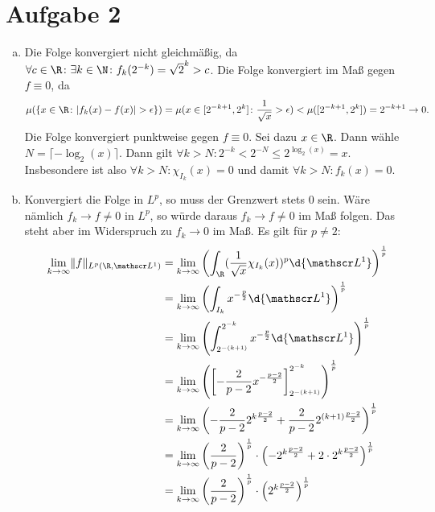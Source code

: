\documentclass{article}
\newcommand{\norm}[1]{\lVert #1 \rVert}
\begin{document}
    \section*{Aufgabe 2}
    \begin{enumerate}[(a)]
        \item Die Folge konvergiert nicht gleichmäßig, da $\forall c \in \R\colon \exists k \in \N \colon f_k(2^{-k}) = \sqrt{2}^k > c$.
        Die Folge konvergiert im Maß gegen $f \equiv 0$, da 
        \[ 
            \mu(\{x \in \R\colon |f_k(x) - f(x)|> \epsilon\}) = \mu(x \in [2^{-k+1}, 2^k]\colon \frac{1}{\sqrt{x}} > \epsilon) < \mu([2^{-k+1}, 2^k]) = 2^{-k+1} \to 0.
        \]
        Die Folge konvergiert punktweise gegen $f\equiv 0$. Sei dazu $x\in \R$. Dann wähle $N = \lceil - \log_2(x) \rceil$. Dann gilt $\forall k > N\colon 2^{-k} < 2^{-N} \leq 2^{\log_2(x)} = x$. Insbesondere ist also $\forall k > N\colon \chi_{I_k}(x) = 0$ und damit $\forall k > N\colon f_k(x) = 0$.
        \item Konvergiert die Folge in $L^p$, so muss der Grenzwert stets $0$ sein. Wäre nämlich $f_k \to f \neq 0$ in $L^p$, so würde daraus $f_k \to f \neq 0$ im Maß folgen. Das steht aber im Widerspruch zu $f_k \to 0$ im Maß.
        Es gilt für $p \neq 2$:
        \begin{align*}
            \lim\limits_{k \to \infty} \norm{f}_{L^p(\R, \mathscr L^1)} &= \lim\limits_{k \to \infty} \left(\int_\R (\frac{1}{\sqrt{x}}\chi_{I_k}(x))^p \d{\mathscr L^1}\right)^\frac{1}{p}\\
            &= \lim\limits_{k \to \infty} \left(\int_{I_k} x^{-\frac{p}{2}} \d{\mathscr L^1}\right)^\frac{1}{p}\\
            &= \lim\limits_{k \to \infty} \left(\int_{2^{-(k+1)}}^{2^{-k}} x^{-\frac{p}{2}} \d{\mathscr L^1}\right)^\frac{1}{p}\\
            &= \lim\limits_{k \to \infty} \left(\left[ - \frac{2}{p-2} x^{-\frac{p-2}{2}}\right]_{2^{-(k+1)}}^{2^{-k}}\right)^\frac{1}{p}\\
            &= \lim\limits_{k \to \infty} \left(- \frac{2}{p-2} 2^{k\frac{p-2}{2}} + \frac{2}{p-2} 2^{(k+1)\frac{p-2}{2}}\right)^\frac{1}{p}\\
            &= \lim\limits_{k \to \infty} \left(\frac{2}{p-2}\right)^\frac{1}{p} \cdot \left(- 2^{k\frac{p-2}{2}} + 2 \cdot 2^{k\frac{p-2}{2}}\right)^\frac{1}{p}\\
            &= \lim\limits_{k \to \infty} \left(\frac{2}{p-2}\right)^\frac{1}{p} \cdot  \left(2^{k\frac{p-2}{2}}\right)^\frac{1}{p}\\

\end{align*}
\end{enumerate}
\end{document}
